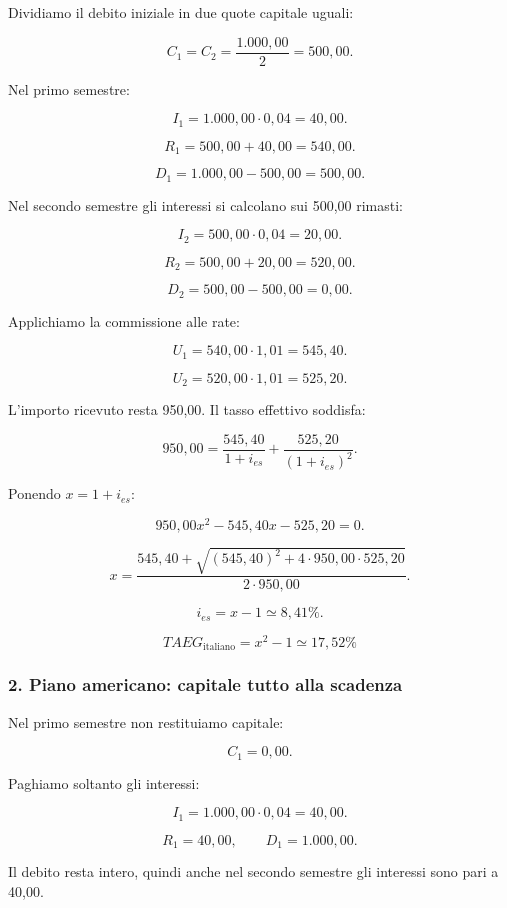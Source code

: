 \noindent Dividiamo il debito iniziale
in due quote capitale uguali:

\[
C_1=C_2=
\frac{1.000{,}00}{2}
=
\boxed{500{,}00}.
\]

\noindent Nel primo semestre:

\[
I_1=1.000{,}00\cdot0{,}04=40{,}00.
\]

\[
R_1=500{,}00+40{,}00=540{,}00.
\]

\[
D_1=1.000{,}00-500{,}00=500{,}00.
\]

\noindent Nel secondo semestre
gli interessi si calcolano sui 500,00 rimasti:

\[
I_2=500{,}00\cdot0{,}04=20{,}00.
\]

\[
R_2=500{,}00+20{,}00=520{,}00.
\]

\[
D_2=500{,}00-500{,}00=0{,}00.
\]

\noindent Applichiamo la commissione alle rate:

\[
U_1=540{,}00\cdot1{,}01=\boxed{545{,}40}.
\]

\[
U_2=520{,}00\cdot1{,}01=\boxed{525{,}20}.
\]

\noindent L'importo ricevuto resta 950,00.
Il tasso effettivo soddisfa:

\[
950{,}00
=
\frac{545{,}40}{1+i_{es}}
+
\frac{525{,}20}{(1+i_{es})^2}.
\]

\noindent Ponendo $x=1+i_{es}$:

\[
950{,}00x^2-545{,}40x-525{,}20=0.
\]

\[
x=
\frac{
545{,}40+
\sqrt{(545{,}40)^2+4\cdot950{,}00\cdot525{,}20}
}{
2\cdot950{,}00
}.
\]

\[
i_{es}=x-1\simeq\boxed{8{,}41\%}.
\]

\[
\boxed{
TAEG_{\text{italiano}}=x^2-1\simeq17{,}52\%
}
\]


\subsubsection*{2. Piano americano: capitale tutto alla scadenza}

\noindent Nel primo semestre
non restituiamo capitale:

\[
C_1=0{,}00.
\]

\noindent Paghiamo soltanto gli interessi:

\[
I_1=1.000{,}00\cdot0{,}04=40{,}00.
\]

\[
R_1=40{,}00,
\qquad
D_1=1.000{,}00.
\]

\noindent Il debito resta intero,
quindi anche nel secondo semestre
gli interessi sono pari a 40,00.

